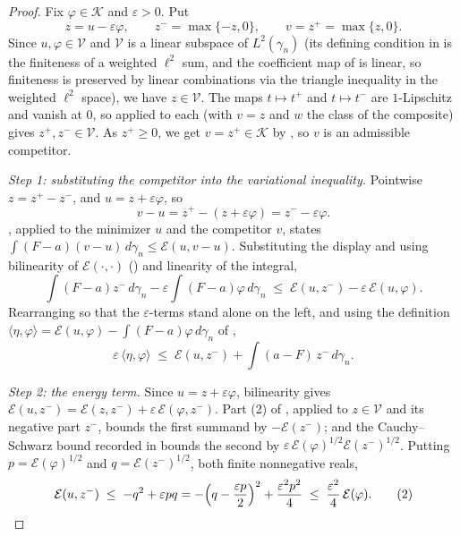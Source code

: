 \begin{proof}
Fix $\varphi \in \mathcal{K}$ and $\varepsilon > 0$.  Put
\[
  z = u - \varepsilon\varphi,
  \qquad z^- = \max\{-z, 0\},
  \qquad v = z^+ = \max\{z,0\} .
\]
Since $u, \varphi \in \mathcal{V}$ and $\mathcal{V}$ is a linear subspace of
$L^2(\gamma_n)$ (its defining condition in  is the finiteness of a
weighted $\ell^2$ sum, and the coefficient map of  is
linear, so finiteness is preserved by linear combinations via the triangle
inequality in the weighted $\ell^2$ space), we have $z \in \mathcal{V}$.  The maps
$t \mapsto t^+$ and $t\mapsto t^-$ are $1$-Lipschitz and vanish at $0$, so
 applied to each (with $v = z$ and $w$ the class of
the composite) gives $z^+, z^- \in \mathcal{V}$.  As $z^+ \geq 0$, we get
$v = z^+ \in \mathcal{K}$ by , so $v$ is an admissible
competitor.

\emph{Step 1: substituting the competitor into the variational inequality.}
Pointwise $z = z^+ - z^-$, and $u = z + \varepsilon\varphi$, so
\[
  v - u = z^+ - (z + \varepsilon\varphi) = z^- - \varepsilon\varphi .
\]
, applied to the minimizer $u$ and the competitor
$v$, states
$\int (F-a)(v-u)\,d\gamma_n \leq \mathcal{E}(u, v-u)$.  Substituting the display
and using bilinearity of $\mathcal{E}(\cdot,\cdot)$ () and
linearity of the integral,
\[
  \int (F-a)z^-\,d\gamma_n - \varepsilon\int(F-a)\varphi\, d\gamma_n
    \;\leq\; \mathcal{E}(u, z^-) - \varepsilon\,\mathcal{E}(u,\varphi) .
\]
Rearranging so that the $\varepsilon$-terms stand alone on the left, and using
the definition $\langle\eta,\varphi\rangle = \mathcal{E}(u,\varphi) - \int(F-a)\varphi\,d\gamma_n$
of ,
\begin{equation*}
  \varepsilon\,\langle \eta,\varphi\rangle
    \;\leq\; \mathcal{E}(u, z^-) + \int (a-F)\,z^-\, d\gamma_n . \tag{1}
\end{equation*}

\emph{Step 2: the energy term.}
Since $u = z + \varepsilon\varphi$, bilinearity gives
$\mathcal{E}(u, z^-) = \mathcal{E}(z, z^-) + \varepsilon\,\mathcal{E}(\varphi, z^-)$.
Part (2) of , applied to $z \in \mathcal{V}$ and
its negative part $z^-$, bounds the first summand by $-\mathcal{E}(z^-)$; and the
Cauchy--Schwarz bound recorded in  bounds the second by
$\varepsilon\,\mathcal{E}(\varphi)^{1/2}\mathcal{E}(z^-)^{1/2}$.  Putting
$p = \mathcal{E}(\varphi)^{1/2}$ and $q = \mathcal{E}(z^-)^{1/2}$, both finite
nonnegative reals,
\begin{equation*}
  \mathcal{E}(u,z^-) \;\leq\; -q^2 + \varepsilon p q
    = -\Bigl(q - \frac{\varepsilon p}{2}\Bigr)^2 + \frac{\varepsilon^2 p^2}{4}
    \;\leq\; \frac{\varepsilon^2}{4}\,\mathcal{E}(\varphi) . \tag{2}
\end{equation*}


\end{proof}
